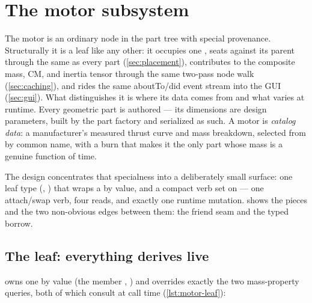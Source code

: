 \section{The motor subsystem}\label{sec:motor}

The motor is an ordinary node in the part tree with special provenance. Structurally it is a leaf
like any other: it occupies one , seats against its parent through the same
 as every part (\cref{sec:placement}), contributes to the composite mass, CM, and
inertia tensor through the same two-pass node walk (\cref{sec:caching}), and rides the same
aboutTo/did event stream into the GUI (\cref{sec:gui}). What distinguishes it is where its data
comes from and what varies at runtime. Every geometric part is authored --- its dimensions are
design parameters, built by the part factory and serialized as such. A motor is \emph{catalog
data}: a manufacturer's measured thrust curve and mass breakdown, selected from
 by common name, with a burn that makes it the only part whose mass is a
genuine function of time.

The design concentrates that specialness into a deliberately small surface: one leaf type
(, ) that wraps a  by
value, and a compact verb set on  --- one attach/swap verb, four 
reads, and exactly one runtime mutation.  shows the pieces and the two
non-obvious edges between them: the friend seam and the typed borrow.


\subsection[The Motor leaf: everything derives live]{The  leaf: everything derives live}\label{sec:motor-leaf}

 owns one  by value (the member ,
) and overrides exactly the two mass-property queries, both of
which consult  at call time (\cref{lst:motor-leaf}):

